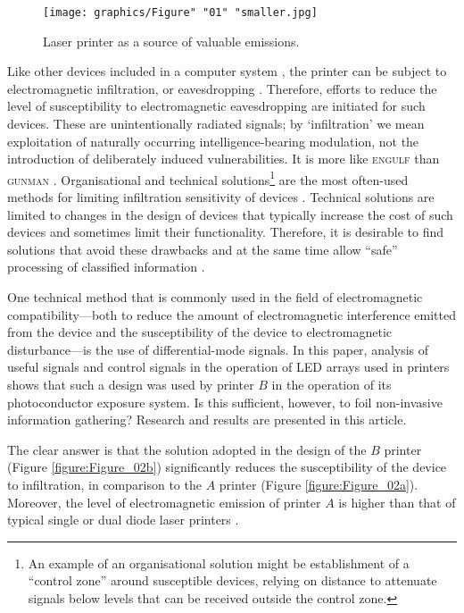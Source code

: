 \documentclass[letterpaper,journal]{ieeetran}
\begin{document}
\begin{figure}[ht]
    \centering
    \texttt{[image: graphics/Figure" "01" "smaller.jpg]}
    \caption{Laser printer as a source of valuable emissions.}
    \label{figure:Figure_01}
\end{figure}

Like other devices included in a computer system \cite{Kuhn2002,Kubiak2016a},
the printer can be subject to electromagnetic infiltration, or eavesdropping
\cite{Ketenci2015a,Kubiak2016b}. Therefore, efforts to reduce the level of
susceptibility to electromagnetic eavesdropping are initiated for such
devices. These are unintentionally radiated signals; by `infiltration' we
mean exploitation of naturally occurring intelligence-bearing modulation, not
the introduction of deliberately induced vulnerabilities. It is more like
\textsc{engulf} than \textsc{gunman} \cite{Wright1987,Maneki2007a}.
Organisational and technical solutions\footnote{An example of an
organisational solution might be establishment of a ``control zone'' around
susceptible devices, relying on distance to attenuate signals below levels
that can be received outside the control zone.} are the most often-used
methods for limiting infiltration sensitivity of devices \cite{Kubiak2006a}.
Technical solutions are limited to changes in the
design of devices that typically increase the cost of such devices and
sometimes limit their functionality. Therefore, it is desirable to find
solutions that avoid these drawbacks and at the same time allow ``safe''
processing of classified information \cite{Wasfy2011a,Goel2012a}.

One technical method that is commonly used in the field of electromagnetic
compatibility---both to reduce the amount of electromagnetic interference
emitted from the device and the susceptibility of the device to
electromagnetic disturbance---is the use of differential-mode signals.
In this paper, analysis of useful signals and control signals
\cite{Kubiak2017d} in the operation of LED arrays
used in printers shows that such a design was used by printer $B$ in the
operation of its photoconductor exposure system. Is this sufficient, however,
to foil non-invasive information gathering? Research and results are
presented in this article.

The clear answer is that the solution adopted in the design of the $B$
printer (Figure \ref{figure:Figure_02b}) significantly reduces the
susceptibility of the device to infiltration, in comparison to the $A$
printer (Figure \ref{figure:Figure_02a}). Moreover, the level of
electromagnetic emission of printer $A$ is higher than that of
typical single or dual diode laser printers \cite{Kubiak2014b}.
\end{document}
